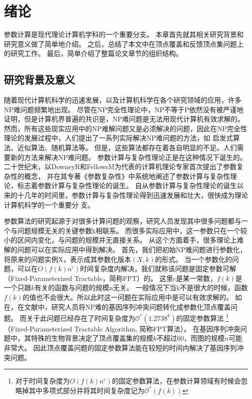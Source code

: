 ﻿\chapter{绪论}
参数计算是现代理论计算机学科的一个重要分支。
本章首先就其相关研究背景和研究意义做了简单地介绍。
之后，总结了本文中在顶点覆盖和反馈顶点集问题上的研究工作。
最后，简单介绍了整篇论文章节的组织结构。

\section{研究背景及意义}
随着现代计算机科学的迅速发展，以及计算机科学在各个研究领域的应用，许多NP难问题频繁地出现。
尽管在NP完全性理论中，NP不等于P依然没有被严谨地证明，但是计算机界普遍的共识是，NP难问题是无法用现代计算机有效求解的。
然而，所有这些现实应用中的NP难解问题又是必须解决的问题，因此在NP完全性理论的发展过程中，人们提出了一系列实际解决NP难问题的方法，如
启发式算法、近似算法、随机算法等。
但是，这些算法都存在着各自明显的不足。人们需要新的方法来解决NP难问题。
参数计算与复杂性理论正是在这种情况下诞生的。
二十世纪末，以DowneyR和FellowsM为代表的计算机理论专家首次提出了参数复杂性的概念，
并在其专著《参数复杂性》中系统地阐述了参数计算与复杂性理论，标志着参数计算与复杂性理论的诞生。
自从参数计算与复杂性理论的诞生以来的十几年的时间里，参数计算与复杂性理论得到迅速发展和壮大，很快成为理论计算机科学的一个重要分
支。

参数算法的研究起源于对很多计算问题的观察，研究人员发现其中很多问题都与一个与问题规模无关的关键参数k相联系。
而很多实际应用中，这一参数只在一个较小的区间内变化，与问题的规模并无直接关系。
从这个方面着手，很多理论上难解的问题可以在实际应用中得到解决。
首先，我们把初始NP难问题进行参数化，将原来的问题实例X，表示成其参数化版本$(X, k)$的形式。
当一个参数化的问题，可以在$O(f(k)n^c)$时间复杂度内解决，我们就称该问题是固定参数可解（Fixed-Parameterized Tractable，简称FPT）的。
这里c是某一常数，$f(k)$是一个只跟$k$有关的函数与问题的规模n无关。
一般情况下当k不是很大的时候，函数$f(k)$的值也不会很大。所以此时这一问题在实际应用中是可以有效求解的。
如在，在文献\cite{gonnet2000darwin}中，研究人员将NP难的基因序列冲突问题转化成参数化顶点覆盖问题。
而关于此问题已经存在了时间复杂度为$\mathcal{O}^*(1.2738^k)$的固定参数算法
\footnote{对于时间复杂度为$O(f(k)n^c)$的固定参数算法，在参数计算领域有时候会忽略掉其中多项式部分并将其时间复杂度记为$\mathcal{O}^*(f(k))$}（Fixed-Parameterized Tractable Algorithm, 简称FPT算法）。
在基因序列冲突问题中，其特殊的生物背景决定了顶点覆盖集的规模$k$不超过$60$，而图的规模$n$可能非常大。
因此顶点覆盖问题的固定参数算法能在较短的时间内解决了基因序列冲突问题。

